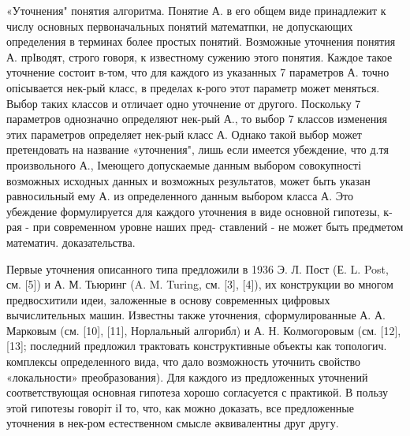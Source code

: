\documentclass[10pt]{article}
\begin{document}
«Уточнения" понятия алгоритма. Понятие А. в его общем виде принадлежит к числу основных первоначальных понятий математпки, не допускающих определения в терминах более простых понятий. Возможные уточнения понятия А. прІводят, строго говоря, к известному сужению этого понятия. Каждое такое уточнение состоит в-том, что для каждого из указанных 7 параметров А. точно опісывается нек-рый класс, в пределах к-рого этот параметр может меняться. Выбор таких классов и отличает одно уточнение от другого. Поскольку 7 параметров однозначно определяют нек-рый А., то выбор 7 классов изменения этих параметров определяет нек-рый класс А. Однако такой выбор может претендовать на название «уточнения", лишь если имеется убеждение, что д.тя произвольного А., Імеющего допускаемые данным выбором совокупності возможных исходных данных и возможных результатов, может быть указан равносильный ему А. из определенного данным выбором класса А. Это убеждение формулируется для каждого уточнения в виде основной гипотезы, к-рая - при современном уровне наших пред- ставлений - не может быть предметом математич. доказательства.



Первые уточнения описанного типа предложили в 1936 Э. Л. Пост (Е. L. Post, см. [5]) и А. М. Тьюринг (A. M. Turing, см. [3], [4]), их конструкции во многом предвосхитили идеи, заложенные в основу современных цифровых вычислительных машин. Известны также уточнения, сформулированные А. А. Марковым (см. [10], [11], Норлальный алгорибл) и А. Н. Колмогоровым (см. [12], [13]; последний предложил трактовать конструктивные объекты как топологич. комплексы определенного вида, что дало возможность уточнить свойство «локальности» преобразования). Для каждого из предложенных уточнений соответствующая основная гипотеза хорошо согласуется с практикой. В пользу этой гипотезы говоріт іІ то, что, как можно доказать, все предложенные уточнения в нек-ром естественном смысле әквивалентны друг другу.
\end{document}

